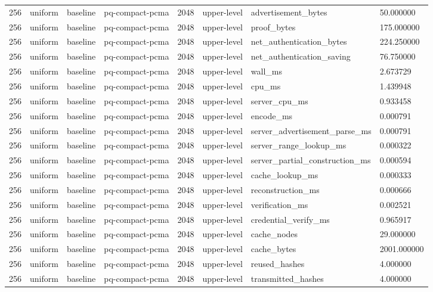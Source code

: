 \begin{tabular}{llllllll}
256 & uniform & baseline & pq-compact-pcma & 2048 & upper-level & advertisement\_bytes & 50.000000 \\
256 & uniform & baseline & pq-compact-pcma & 2048 & upper-level & proof\_bytes & 175.000000 \\
256 & uniform & baseline & pq-compact-pcma & 2048 & upper-level & net\_authentication\_bytes & 224.250000 \\
256 & uniform & baseline & pq-compact-pcma & 2048 & upper-level & net\_authentication\_saving & 76.750000 \\
256 & uniform & baseline & pq-compact-pcma & 2048 & upper-level & wall\_ms & 2.673729 \\
256 & uniform & baseline & pq-compact-pcma & 2048 & upper-level & cpu\_ms & 1.439948 \\
256 & uniform & baseline & pq-compact-pcma & 2048 & upper-level & server\_cpu\_ms & 0.933458 \\
256 & uniform & baseline & pq-compact-pcma & 2048 & upper-level & encode\_ms & 0.000791 \\
256 & uniform & baseline & pq-compact-pcma & 2048 & upper-level & server\_advertisement\_parse\_ms & 0.000791 \\
256 & uniform & baseline & pq-compact-pcma & 2048 & upper-level & server\_range\_lookup\_ms & 0.000322 \\
256 & uniform & baseline & pq-compact-pcma & 2048 & upper-level & server\_partial\_construction\_ms & 0.000594 \\
256 & uniform & baseline & pq-compact-pcma & 2048 & upper-level & cache\_lookup\_ms & 0.000333 \\
256 & uniform & baseline & pq-compact-pcma & 2048 & upper-level & reconstruction\_ms & 0.000666 \\
256 & uniform & baseline & pq-compact-pcma & 2048 & upper-level & verification\_ms & 0.002521 \\
256 & uniform & baseline & pq-compact-pcma & 2048 & upper-level & credential\_verify\_ms & 0.965917 \\
256 & uniform & baseline & pq-compact-pcma & 2048 & upper-level & cache\_nodes & 29.000000 \\
256 & uniform & baseline & pq-compact-pcma & 2048 & upper-level & cache\_bytes & 2001.000000 \\
256 & uniform & baseline & pq-compact-pcma & 2048 & upper-level & reused\_hashes & 4.000000 \\
256 & uniform & baseline & pq-compact-pcma & 2048 & upper-level & transmitted\_hashes & 4.000000 \\

\end{tabular}
